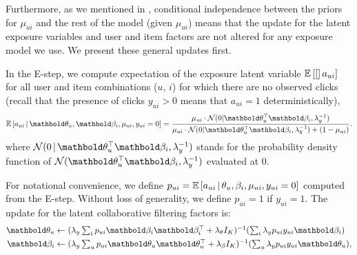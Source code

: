 Furthermore, as we mentioned in , conditional independence 
between the priors for $\mu_{ui}$ and the rest of the model (given $\mu_{ui}$) 
means that the update for the latent exposure variables and user and item factors are not altered for any exposure model we use. We present these general updates first.

In the E-step, we compute expectation of the exposure latent variable $\mathbb{E}\left[[\right]a_{ui}]$ for all user and item combinations ($u$, $i$) for which there are no observed clicks (recall that the presence of clicks $y_{ui}>0$ means that $a_{ui}=1$ deterministically),
\begin{equation}
\E{a_{ui} \g \mb\theta_u, \mb\beta_i, \mu_{ui}, y_{ui} = 0} = \frac{\mu_{ui} \cdot \mathcal{N}(0 | \mb\theta_u^\top\mb\beta_i, \lambda_y^{-1})}{\mu_{ui}\cdot \mathcal{N}(0 |  \mb\theta_u^\top \mb\beta_i, \lambda_y^{-1}) + (1 - \mu_{ui})}.
\label{eq:update_a}
\end{equation}
where $\mathcal{N}(0 \g \mb\theta_u^\top\mb\beta_i, \lambda_y^{-1})$ stands for the probability density function of $\mathcal{N}(\mb\theta_u^\top\mb\beta_i, \lambda_y^{-1})$ evaluated at $0$. 

For notational convenience, we define $p_{ui} = \mathbb{E}\left[a_{ui} \,\vert\, \theta_u, \beta_i, \mu_{ui}, y_{ui} = 0\right]$ computed from the E-step. Without loss of generality, we define $p_{ui} = 1$ if $y_{ui} = 1$. The update for the latent collaborative filtering factors is:
\begin{align}
\mb\theta_u &\leftarrow \textstyle(\lambda_y \sum_i p_{ui} \mb\beta_i \mb\beta_i^\top +  \lambda_\theta I_K)^{-1} (\sum_i \lambda_y p_{ui} y_{ui} \mb\beta_i ) \label{eq:update_theta}\\
\mb\beta_i &\leftarrow \textstyle(\lambda_y \sum_u p_{ui} \mb\theta_u \mb\theta_u^\top + \lambda_\beta I_K)^{-1} (\sum_u \lambda_y p_{ui} {y}_{ui} \mb\theta_u), \label{eq:update_beta}
\end{align}

